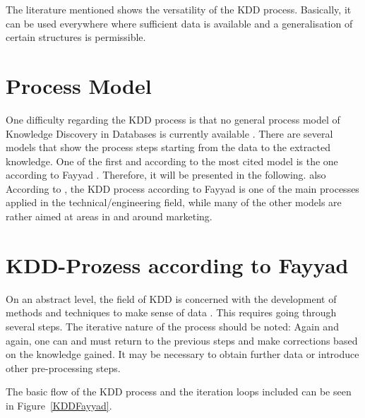 The literature mentioned shows the versatility of the KDD process. Basically, it can be used everywhere where sufficient data is available and a generalisation of certain structures is permissible. 


\section{Process Model}

One difficulty regarding the KDD process is that \glqq no general process model of Knowledge Discovery in Databases is currently available \grqq \cite{Dusing.2000}. There are several models that show the process steps starting from the data to the extracted knowledge.  One of the first and according to \cite{Kurgan:2006} the most cited model is the one according to Fayyad \cite{Fayyad:1996}. Therefore, it will be presented in the following. also According to \cite{Kurgan:2006}, the KDD process according to Fayyad is one of the main processes applied in the technical/engineering field, while many of the other models are rather aimed at areas in and around marketing.

\section{KDD-Prozess according to Fayyad}
On an abstract level, the field of KDD is concerned with the development of methods and techniques to \glqq make sense of data \grqq \cite{Fayyad:1996}. This requires going through several steps. The iterative nature of the process should be noted: Again and again, one can and must return to the previous steps and make corrections based on the knowledge gained. It may be necessary to obtain further data or introduce other pre-processing steps. \cite{Wrobel:1998}

The basic flow of the KDD process and the iteration loops included can be seen in Figure~\ref{KDDFayyad}.

